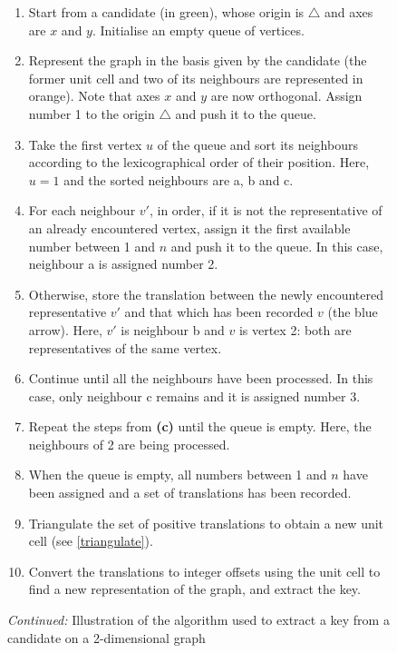 \documentclass[main.tex]{subfiles}
\begin{document}
\begin{figure}\ContinuedFloat
	\begin{fminipage}{\linewidth}
	\begin{enumerate}[label={\sffamily\small\bfseries(\alph*)},itemsep=0em]
		\item Start from a candidate (in {\color{green!50!black}green}), whose origin is $\boldsymbol\triangle$ and axes are $x$ and $y$. Initialise an empty queue of vertices.
		\item Represent the graph in the basis given by the candidate (the former unit cell and two of its neighbours are represented in {\color{orange}orange}). Note that axes $x$ and $y$ are now orthogonal. Assign number 1 to the origin $\boldsymbol\triangle$ and push it to the queue.
		\item Take the first vertex $u$ of the queue and sort its neighbours according to the lexicographical order of their position. Here, $u = 1$ and the sorted neighbours are a, b and c.
		\item For each neighbour $v'$, in order, if it is not the representative of an already encountered vertex, assign it the first available number between 1 and $n$ and push it to the queue. In this case, neighbour a is assigned number 2.
		\item Otherwise, store the translation between the newly encountered representative $v'$ and that which has been recorded $v$ (the {\color{blue}blue} arrow). Here, $v'$ is neighbour b and $v$ is vertex 2: both are representatives of the same vertex.
		\item Continue until all the neighbours have been processed. In this case, only neighbour c remains and it is assigned number 3.
		\item Repeat the steps from {\sffamily\small\bfseries(c)} until the queue is empty. Here, the neighbours of 2 are being processed.
		\item When the queue is empty, all numbers between 1 and $n$ have been assigned and a set of translations has been recorded.
		\item Triangulate the set of positive translations to obtain a new unit cell (see \cref{triangulate}).
		\item Convert the translations to integer offsets using the unit cell to find a new representation of the graph, and extract the key.
	\end{enumerate}
	\vspace{8mm}
	
	\caption{\emph{Continued:} Illustration of the algorithm used to extract a key from a candidate on a 2-dimensional graph} \label{algocandidate}
	\end{fminipage}
\end{figure}
\end{document}
